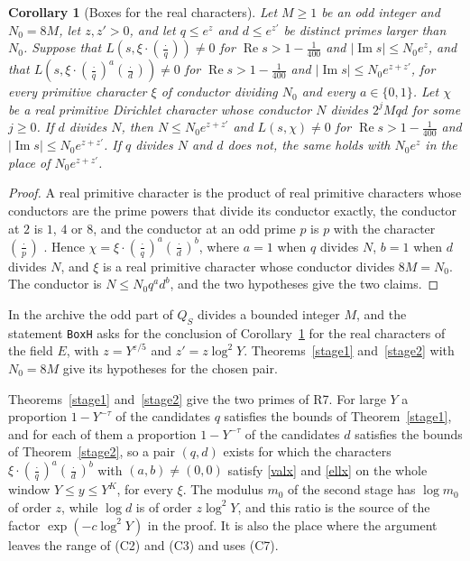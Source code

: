 \documentclass[11pt,letterpaper]{article}
\newtheorem{corollary}[theorem]{Corollary}
\numberwithin{equation}{section}
\begin{document}
\begin{corollary}[Boxes for the real characters]\label{realbox}
Let $M\ge1$ be an odd integer and $N_0=8M$, let $z,z'>0$, and let $q\le e^z$ and $d\le e^{z'}$ be distinct primes larger than $N_0$. Suppose that $L(s,\xi\cdot(\tfrac{\cdot}{q}))\ne0$ for $\operatorname{Re}s>1-\tfrac1{400}$ and $|\operatorname{Im}s|\le N_0e^z$, and that $L(s,\xi\cdot(\tfrac{\cdot}{q})^a(\tfrac{\cdot}{d}))\ne0$ for $\operatorname{Re}s>1-\tfrac1{400}$ and $|\operatorname{Im}s|\le N_0e^{z+z'}$, for every primitive character $\xi$ of conductor dividing $N_0$ and every $a\in\{0,1\}$. Let $\chi$ be a real primitive Dirichlet character whose conductor $N$ divides $2^jMqd$ for some $j\ge0$. If $d$ divides $N$, then $N\le N_0e^{z+z'}$ and $L(s,\chi)\ne0$ for $\operatorname{Re}s>1-\tfrac1{400}$ and $|\operatorname{Im}s|\le N_0e^{z+z'}$. If $q$ divides $N$ and $d$ does not, the same holds with $N_0e^z$ in the place of $N_0e^{z+z'}$.
\end{corollary}
\begin{proof}
A real primitive character is the product of real primitive characters whose conductors are the prime powers that divide its conductor exactly, the conductor at $2$ is $1$, $4$ or $8$, and the conductor at an odd prime $p$ is $p$ with the character $(\tfrac{\cdot}{p})$ \cite[Ch.~5]{davenport}. Hence $\chi=\xi\cdot(\tfrac{\cdot}{q})^a(\tfrac{\cdot}{d})^b$, where $a=1$ when $q$ divides $N$, $b=1$ when $d$ divides $N$, and $\xi$ is a real primitive character whose conductor divides $8M=N_0$. The conductor is $N\le N_0q^ad^b$, and the two hypotheses give the two claims.
\end{proof}

In the archive the odd part of $Q_S$ divides a bounded integer $M$, and the statement \texttt{BoxH} asks for the conclusion of Corollary~\ref{realbox} for the real characters of the field $E$, with $z=Y^{\varepsilon/5}$ and $z'=z\log^2Y$. Theorems~\ref{stage1} and~\ref{stage2} with $N_0=8M$ give its hypotheses for the chosen pair.

Theorems~\ref{stage1} and~\ref{stage2} give the two primes of R7. For large $Y$ a proportion $1-Y^{-\tau}$ of the candidates $q$ satisfies the bounds of Theorem~\ref{stage1}, and for each of them a proportion $1-Y^{-\tau}$ of the candidates $d$ satisfies the bounds of Theorem~\ref{stage2}, so a pair $(q,d)$ exists for which the characters $\xi\cdot(\tfrac{\cdot}{q})^a(\tfrac{\cdot}{d})^b$ with $(a,b)\ne(0,0)$ satisfy \eqref{valx} and \eqref{ellx} on the whole window $Y\le y\le Y^K$, for every $\xi$. The modulus $m_0$ of the second stage has $\log m_0$ of order $z$, while $\log d$ is of order $z\log^2Y$, and this ratio is the source of the factor $\exp(-c\log^2Y)$ in the proof. It is also the place where the argument leaves the range of (C2) and (C3) and uses (C7).
\end{document}

